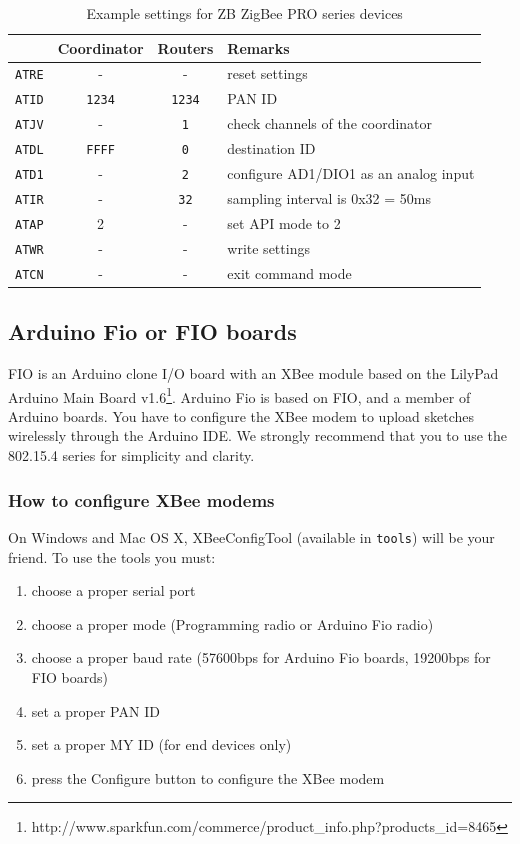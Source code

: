 \documentclass[9pt]{jsarticle}
\begin{document}
\begin{table}[htdp]
\begin{center}
\small
\begin{tabular}{|r|c|c|l|}
\hline   & Coordinator & Routers & Remarks \\\hline
\hline \texttt{ATRE} & - & - & reset settings \\
\hline \texttt{ATID} & \texttt{1234} & \texttt{1234} & PAN ID \\
\hline \texttt{ATJV} & - & \texttt{1} & check channels of the coordinator \\
\hline \texttt{ATDL} & \texttt{FFFF} & \texttt{0} & destination ID \\
\hline \texttt{ATD1} & - & \texttt{2} & configure AD1/DIO1 as an analog input \\
\hline \texttt{ATIR} & - & \texttt{32} & sampling interval is 0x32 = 50ms \\
\hline \texttt{ATAP} & 2 & - & set API mode to 2 \\
\hline \texttt{ATWR} & - & - & write settings \\
\hline \texttt{ATCN} & - & - & exit command mode \\
\hline 
\end{tabular} 
\caption{Example settings for ZB ZigBee PRO series devices}
\end{center}
\label{xbee}
\end{table}

\clearpage
\subsection{Arduino Fio or FIO boards}
FIO is an Arduino clone I/O board with an XBee module based on the LilyPad Arduino Main Board v1.6\footnote{http://www.sparkfun.com/commerce/product\_info.php?products\_id=8465}. Arduino Fio is based on FIO, and a member of Arduino boards. You have to configure the XBee modem to upload sketches wirelessly through the Arduino IDE. We strongly recommend that you to use the 802.15.4 series for simplicity and clarity.

\subsubsection{How to configure XBee modems}
On Windows and Mac OS X, XBeeConfigTool (available in \texttt{tools}) will be your friend. To use the tools you must:

\begin{enumerate}
\item choose a proper serial port
\item choose a proper mode (Programming radio or Arduino Fio radio)
\item choose a proper baud rate (57600bps for Arduino Fio boards, 19200bps for FIO boards)
\item set a proper PAN ID
\item set a proper MY ID (for end devices only)
\item press the Configure button to configure the XBee modem 
\end{enumerate}
\end{document}
